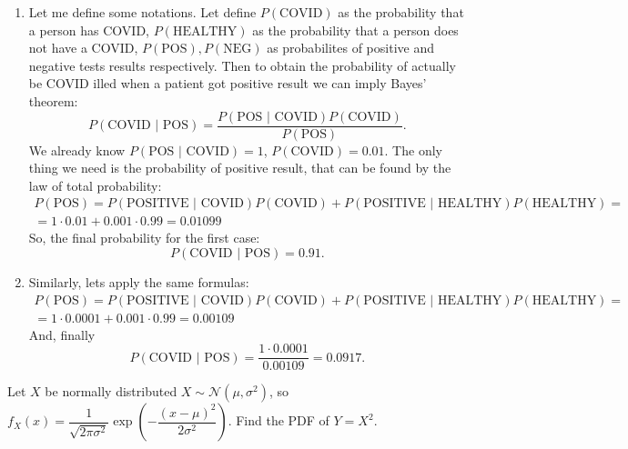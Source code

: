 \documentclass[12pt]{report}
\begin{document}
\begin{solution}
    \begin{enumerate}
        \item Let me define some notations. Let define $P(\text{COVID})$ as the probability that a person has COVID, $P(\text{HEALTHY})$ as the probability that a person does not have a COVID, $P(\text{POS}), P(\text{NEG})$ as probabilites of positive and negative tests results respectively. Then to obtain the probability of actually be COVID illed when a patient got positive result we can imply Bayes' theorem:
    \[
        P(\text{COVID }| \text{ POS}) = \dfrac{P(\text{POS }| \text{ COVID}) P(\text{COVID})}{P(\text{POS})}. 
    \] 
    We already know $P(\text{POS }| \text{ COVID}) = 1$, $P(\text{COVID}) = 0.01$. The only thing we need is the probability of positive result, that can be found by the law of total probability:
    \[
        \begin{array}{c}
            P(\text{POS}) = P(\text{POSITIVE }| \text{ COVID}) P(\text{COVID}) + P(\text{POSITIVE } | \text{ HEALTHY}) P(\text{HEALTHY}) = \\ = 1 \cdot 0.01 + 0.001 \cdot 0.99 = 0.01099              
        \end{array}
    \] 
    So, the final probability for the first case:
    \[
        P(\text{COVID }| \text{ POS}) = 0.91.
    \]
    \item Similarly, lets apply the same formulas:
    \[
        \begin{array}{c}
            P(\text{POS}) = P(\text{POSITIVE }| \text{ COVID}) P(\text{COVID}) + P(\text{POSITIVE } | \text{ HEALTHY}) P(\text{HEALTHY}) = \\ = 1 \cdot 0.0001 + 0.001 \cdot 0.99 = 0.00109              
        \end{array}
    \] 
    And, finally
    \[
        P(\text{COVID }| \text{ POS})  = \dfrac{1\cdot 0.0001}{0.00109} = 0.0917.
    \]
    \end{enumerate}
\end{solution}

\begin{problem}{}
    Let $X$ be normally distributed $X \sim \mathcal{N}\left(\mu, \sigma^2\right)$, so $f_X(x) = \dfrac{1}{\sqrt{2\pi\sigma^2}} \exp\left(-\dfrac{\left(x - \mu\right)^2}{2\sigma^2}\right)$. Find the PDF of $Y = X^2$.
\end{problem}
\end{document}
